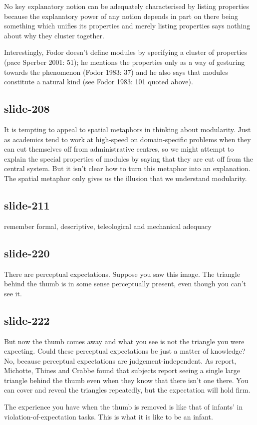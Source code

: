\documentclass[12pt,\papersize]{extarticle}
\begin{document}
No key explanatory notion can be adequately characterised by listing properties because the explanatory power of any notion depends in part on there being something which unifies its properties and merely listing properties says nothing about why they cluster together.
 
Interestingly, Fodor doesn't define modules by specifying a cluster of properties (pace Sperber 2001: 51); he mentions the properties only as a way of gesturing towards the phenomenon (Fodor 1983: 37) and he also says that modules constitute a natural kind (see Fodor 1983: 101 quoted above).
 
 
\subsection{slide-208}
It is tempting to appeal to spatial metaphors in thinking about modularity. Just as academics tend to work at high-speed on domain-specific problems when they can cut themselves off from administrative centres, so we might attempt to explain the special properties of modules by saying that they are cut off from the central system. But it isn't clear how to turn this metaphor into an explanation. The spatial metaphor only gives us the illusion that we understand modularity.
 
 
\subsection{slide-211}
remember formal, descriptive, teleological and mechanical adequacy
 
 
\subsection{slide-220}
There are perceptual expectations.
Suppose you saw this image.
The triangle behind the thumb is in some sense perceptually present, even though you can't see it.
 
 
\subsection{slide-222}
But now the thumb comes away and what you see is not the triangle you were expecting.
Could these perceptual expectations be just a matter of knowledge?
No, because perceptual expectations are judgement-independent.
As \citep{kellman:1983_perception} report, Michotte, Thines and Crabbe found that subjects report seeing a single large triangle behind the thumb even when they know that there isn't one there.
You can cover and reveal the triangles repeatedly, but the expectation will hold firm.
 
The experience you have when the thumb is removed is like that of infants' in violation-of-expectation tasks.
This is what it is like to be an infant.
 

 






\end{document}
